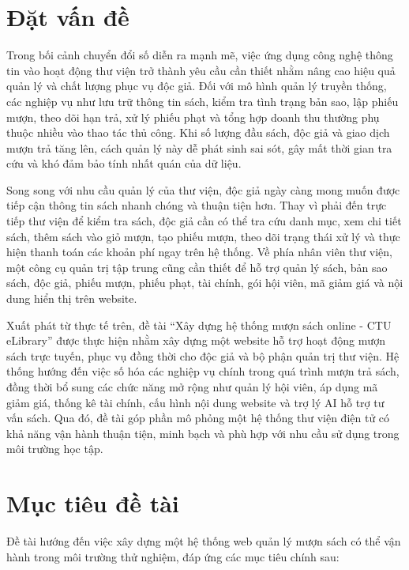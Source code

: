 \documentclass[../main.tex]{subfiles}
\begin{document}
\section{Đặt vấn đề}

Trong bối cảnh chuyển đổi số diễn ra mạnh mẽ, việc ứng dụng công nghệ thông tin vào hoạt động thư viện trở thành yêu cầu cần thiết nhằm nâng cao hiệu quả quản lý và chất lượng phục vụ độc giả. Đối với mô hình quản lý truyền thống, các nghiệp vụ như lưu trữ thông tin sách, kiểm tra tình trạng bản sao, lập phiếu mượn, theo dõi hạn trả, xử lý phiếu phạt và tổng hợp doanh thu thường phụ thuộc nhiều vào thao tác thủ công. Khi số lượng đầu sách, độc giả và giao dịch mượn trả tăng lên, cách quản lý này dễ phát sinh sai sót, gây mất thời gian tra cứu và khó đảm bảo tính nhất quán của dữ liệu.

Song song với nhu cầu quản lý của thư viện, độc giả ngày càng mong muốn được tiếp cận thông tin sách nhanh chóng và thuận tiện hơn. Thay vì phải đến trực tiếp thư viện để kiểm tra sách, độc giả cần có thể tra cứu danh mục, xem chi tiết sách, thêm sách vào giỏ mượn, tạo phiếu mượn, theo dõi trạng thái xử lý và thực hiện thanh toán các khoản phí ngay trên hệ thống. Về phía nhân viên thư viện, một công cụ quản trị tập trung cũng cần thiết để hỗ trợ quản lý sách, bản sao sách, độc giả, phiếu mượn, phiếu phạt, tài chính, gói hội viên, mã giảm giá và nội dung hiển thị trên website.

Xuất phát từ thực tế trên, đề tài ``Xây dựng hệ thống mượn sách online - CTU eLibrary'' được thực hiện nhằm xây dựng một website hỗ trợ hoạt động mượn sách trực tuyến, phục vụ đồng thời cho độc giả và bộ phận quản trị thư viện. Hệ thống hướng đến việc số hóa các nghiệp vụ chính trong quá trình mượn trả sách, đồng thời bổ sung các chức năng mở rộng như quản lý hội viên, áp dụng mã giảm giá, thống kê tài chính, cấu hình nội dung website và trợ lý AI hỗ trợ tư vấn sách. Qua đó, đề tài góp phần mô phỏng một hệ thống thư viện điện tử có khả năng vận hành thuận tiện, minh bạch và phù hợp với nhu cầu sử dụng trong môi trường học tập.

\section{Mục tiêu đề tài}

Đề tài hướng đến việc xây dựng một hệ thống web quản lý mượn sách có thể vận hành trong môi trường thử nghiệm, đáp ứng các mục tiêu chính sau:
\end{document}
